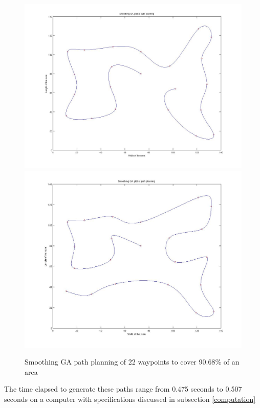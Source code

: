 \begin{figure}[H]
  \includegraphics[width=\linewidth]{figures/22pts_GA_linear_2D_1_smooth.jpg}  
  \endminipage \hfill
  \includegraphics[width=\linewidth]{figures/22pts_GA_linear_2D_2_smooth.jpg}  
  \endminipage \hfill
  
  \caption{Smoothing GA path planning of 22 waypoints to cover 90.68\% of an area}
  \label{fig:smooth_ga_22}
\end{figure}


  

The time elapsed to generate these paths range from 0.475 seconds to 0.507 seconds on a computer with specifications discussed in subsection \ref{computation}


